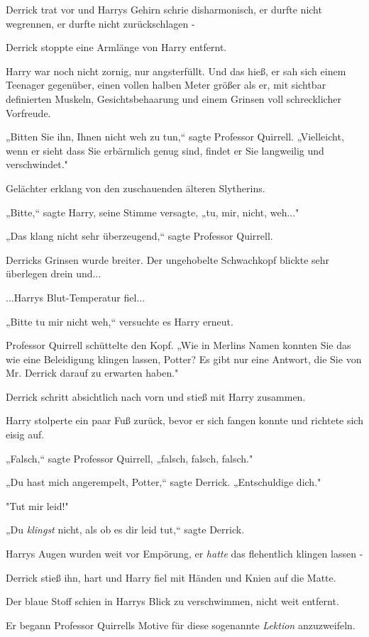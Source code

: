 {Derrick trat vor und Harrys Gehirn schrie disharmonisch, er durfte nicht wegrennen, er durfte nicht zurückschlagen -

Derrick stoppte eine Armlänge von Harry entfernt.

Harry war noch nicht zornig, nur angsterfüllt. Und das hieß, er sah sich einem Teenager gegenüber, einen vollen halben Meter größer als er, mit sichtbar definierten Muskeln, Gesichtsbehaarung und einem Grinsen voll schrecklicher Vorfreude.

„Bitten Sie ihn, Ihnen nicht weh zu tun,“ sagte Professor Quirrell. „Vielleicht, wenn er sieht dass Sie erbärmlich genug sind, findet er Sie langweilig und verschwindet."

Gelächter erklang von den zuschauenden älteren Slytherins.

„Bitte,“ sagte Harry, seine Stimme versagte, „tu, mir, nicht, weh..."

„Das klang nicht sehr überzeugend,“ sagte Professor Quirrell.

Derricks Grinsen wurde breiter. Der ungehobelte Schwachkopf blickte sehr überlegen drein und...

...Harrys Blut-Temperatur fiel...

„Bitte tu mir nicht weh,“ versuchte es Harry erneut.

Professor Quirrell schüttelte den Kopf. „Wie in Merlins Namen konnten Sie das wie eine Beleidigung klingen lassen, Potter? Es gibt nur eine Antwort, die Sie von Mr. Derrick darauf zu erwarten haben."

Derrick schritt absichtlich nach vorn und stieß mit Harry zusammen.

Harry stolperte ein paar Fuß zurück, bevor er sich fangen konnte und richtete sich eisig auf.

„Falsch,“ sagte Professor Quirrell, „falsch, falsch, falsch."

„Du hast mich angerempelt, Potter,“ sagte Derrick. „Entschuldige dich."

"Tut mir leid!"

„Du \emph{klingst} nicht, als ob es dir leid tut,“ sagte Derrick.

Harrys Augen wurden weit vor Empörung, er \emph{hatte} das flehentlich klingen lassen -

Derrick stieß ihn, hart und Harry fiel mit Händen und Knien auf die Matte.

Der blaue Stoff schien in Harrys Blick zu verschwimmen, nicht weit entfernt.

Er begann Professor Quirrells Motive für diese sogenannte \emph{Lektion} anzuzweifeln.

}

